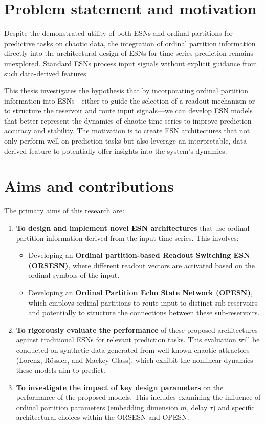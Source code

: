 \section{Problem statement and motivation}
\label{sec:problem_statement_motivation}

Despite the demonstrated utility of both ESNs and ordinal partitions for predictive tasks on chaotic data, the integration of ordinal partition information directly into the architectural design of ESNs for time series prediction remains unexplored. Standard ESNs process input signals without explicit guidance from such data-derived features.

This thesis investigates the hypothesis that by incorporating ordinal partition information into ESNs—either to guide the selection of a readout mechanism or to structure the reservoir and route input signals—we can develop ESN models that better represent the dynamics of chaotic time series to improve prediction accuracy and stability. The motivation is to create ESN architectures that not only perform well on prediction tasks but also leverage an interpretable, data-derived feature to potentially offer insights into the system's dynamics.

\section{Aims and contributions}
\label{sec:aims_contributions}

The primary aims of this research are:

\begin{enumerate}
    \item \textbf{To design and implement novel ESN architectures} that use ordinal partition information derived from the input time series. This involves:
    \begin{itemize}
        \item Developing an \textbf{Ordinal partition-based Readout Switching ESN (ORSESN)}, where different readout vectors are activated based on the ordinal symbols of the input.
        \item Developing an \textbf{Ordinal Partition Echo State Network (OPESN)}, which employs ordinal partitions to route input to distinct sub-reservoirs and potentially to structure the connections between these sub-reservoirs.
    \end{itemize}
    \item \textbf{To rigorously evaluate the performance} of these proposed architectures against traditional ESNs for relevant prediction tasks. This evaluation will be conducted on synthetic data generated from well-known chaotic attractors (Lorenz, Rössler, and Mackey-Glass), which exhibit the nonlinear dynamics these models aim to predict.
    \item \textbf{To investigate the impact of key design parameters} on the performance of the proposed models. This includes examining the influence of ordinal partition parameters (embedding dimension $m$, delay $\tau$) and specific architectural choices within the ORSESN and OPESN.
\end{enumerate}

